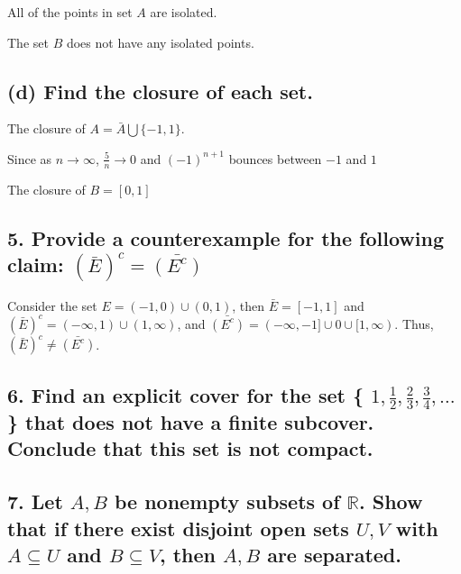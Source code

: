\documentclass{article}
\begin{document}
All of the points in set $A$ are isolated.

The set $B$ does not have any isolated points.

\subsection*{(d) Find the closure of each set.}

The closure of $A = \bar{A} \bigcup \{-1,1\}$.

Since as $n \rightarrow \infty$, $\frac{5}{n} \rightarrow 0$ and $(-1)^{n+1}$ bounces between $-1$ and $1$

The closure of $B = [0,1]$

\subsection*{5. Provide a counterexample for the following claim: $( \bar{E} )^c = \bar{(E^c)}$ }

Consider the set $E = (-1,0) \cup (0,1)$, then $\bar{E} = [-1,1]$ and $( \bar{E} )^c = (- \infty, 1) \cup (1, \infty)$, and $\bar{(E^c)} =(-\infty, -1]
 \cup {0} \cup [1,\infty)$. Thus, $( \bar{E} )^c \ne \bar{(E^c)}$.

\subsection*{6. Find an explicit cover for the set \{ $1, \frac{1}{2}, \frac{2}{3}, \frac{3}{4}, \ldots $ \} that does not have a finite subcover. Conclude that this set is not compact.}

\subsection*{7. Let $A,B$ be nonempty subsets of $\mathbb{R}$. Show that if there exist disjoint open sets $U, V$ with $A \subseteq U$ and $B \subseteq V$, then $A,B$ are separated.}
\end{document}
